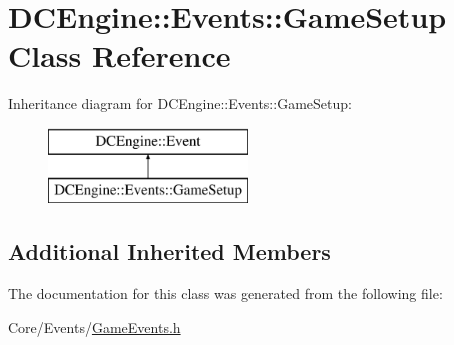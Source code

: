 \hypertarget{classDCEngine_1_1Events_1_1GameSetup}{\section{D\-C\-Engine\-:\-:Events\-:\-:Game\-Setup Class Reference}
\label{classDCEngine_1_1Events_1_1GameSetup}
}
Inheritance diagram for D\-C\-Engine\-:\-:Events\-:\-:Game\-Setup\-:\begin{figure}[H]
\begin{center}
\leavevmode
\includegraphics[height=2.000000cm]{classDCEngine_1_1Events_1_1GameSetup}
\end{center}
\end{figure}
\subsection*{Additional Inherited Members}


The documentation for this class was generated from the following file\-:\begin{DoxyCompactItemize}
\item 
Core/\-Events/\hyperlink{GameEvents_8h}{Game\-Events.\-h}\end{DoxyCompactItemize}
